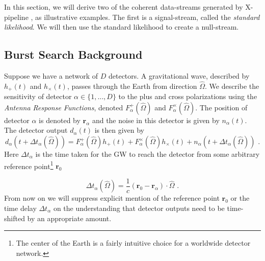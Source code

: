 \documentclass[11pt]{cuthesis}
\newcommand{\fs}{\text{ .}}
\newcommand{\Fp}{F^{+}_{\alpha}}
\newcommand{\Fx}{F^{\times}_{\alpha}}
\newcommand{\xp}{X-pipeline }
\begin{document}
In this section, we will derive two of the coherent data-streams generated by \xp, as illustrative examples. The first is a signal-stream, called the \textit{standard likelihood}. We will then use the standard likelihood to create a null-stream. 

\subsection{Burst Search Background}
Suppose we have a network of $D$ detectors. A gravitational wave, described by $h_+(t)$ and $h_\times (t)$, passes through the Earth from direction $\hat{\Omega}$. We describe the sensitivity of detector $\alpha \in \{1,...,D \}$ to the plus and cross polarizations using the \emph{Antenna Response Functions}, denoted $\Fp (\hat{\Omega})$ and $\Fx(\hat{\Omega})$. The position of detector $\alpha$ is denoted by $\textbf{r}_\alpha$ and the noise in this detector is given by $n_\alpha (t)$. The detector output $d_\alpha (t)$ is then given by
\begin{equation} \label{det_output}
d_\alpha (t + \Delta t_\alpha (\hat{\Omega})) = \Fp (\hat{\Omega}) h_+ (t) + \Fx (\hat{\Omega}) h_\times (t) + n_\alpha (t + \Delta t_\alpha (\hat{\Omega})) \fs
\end{equation}   
Here $\Delta t_\alpha$ is the time taken for the GW to reach the detector from some arbitrary reference point\footnote{The center of the Earth is a fairly intuitive choice for a worldwide detector network.} $\textbf{r}_0$

\begin{equation}
\Delta t_\alpha (\hat{\Omega})=\frac{1}{c}(\textbf{r}_0-\textbf{r}_\alpha)\cdot\hat{\Omega} \fs
\end{equation}
From now on we will suppress explicit mention of the reference point $\textbf{r}_0$ or the time delay $\Delta t_\alpha$ on the understanding that detector outputs need to be time-shifted by an appropriate amount. 
\end{document}
